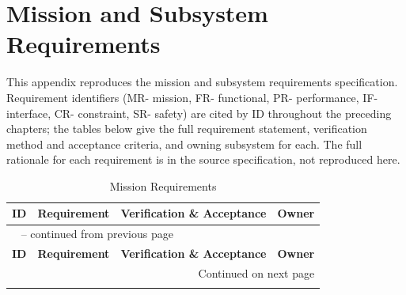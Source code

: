\chapter{Mission and Subsystem Requirements}
\label{app:requirements}

This appendix reproduces the mission and subsystem requirements
specification. Requirement identifiers (MR- mission, FR- functional,
PR- performance, IF- interface, CR- constraint, SR- safety) are cited by
ID throughout the preceding chapters; the tables below give the full
requirement statement, verification method and acceptance criteria, and
owning subsystem for each. The full rationale for each requirement is
in the source specification, not reproduced here.

\begin{landscape}
\scriptsize

\begin{longtable}{p{1.4cm}p{8.2cm}p{10.2cm}p{1.9cm}}
\caption{Mission Requirements}
\label{tab:req-mission} \\
\toprule
\textbf{ID} & \textbf{Requirement} & \textbf{Verification \& Acceptance} & \textbf{Owner} \\
\midrule
\endfirsthead
\multicolumn{4}{l}{\tablename\ \thetable{} -- continued from previous page} \\
\toprule
\textbf{ID} & \textbf{Requirement} & \textbf{Verification \& Acceptance} & \textbf{Owner} \\
\midrule
\endhead
\midrule
\multicolumn{4}{r}{Continued on next page} \\
\endfoot
\bottomrule
\endlastfoot


\end{longtable}
\end{landscape}
